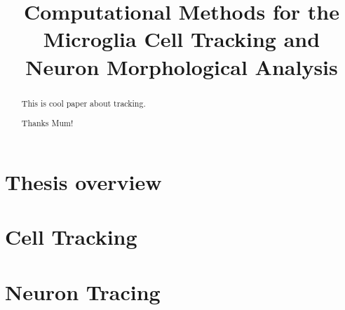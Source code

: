 \documentclass[b5,12pt]{report}
\title{Computational Methods for the Microglia Cell Tracking and Neuron Morphological Analysis}
\begin{document}
\maketitle
\begin{abstract}
 This is cool paper about tracking.
\end{abstract}
\renewcommand{\abstractname}{Acknowledgements}
\begin{abstract}
 Thanks Mum!
\end{abstract}

\tableofcontents
\listoffigures
\part{Thesis overview}

\part{Cell Tracking}

\part{Neuron Tracing}





\end{document}
